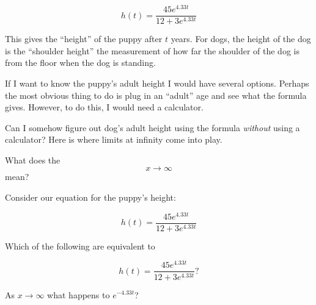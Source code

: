 \documentclass{ximera}
\begin{document}
\[
h(t) = \frac{45 e^{4.33 t}}{12+3 e^{4.33 t}}
\]

This gives the ``height'' of the puppy after $t$ years. For dogs, the
height of the dog is the ``shoulder height'' the measurement of how
far the shoulder of the dog is from the floor when the dog is
standing.

If I want to know the puppy's adult height I would have several
options. Perhaps the most obvious thing to do is plug in an ``adult''
age and see what the formula gives. However, to do this, I would need
a calculator.

Can I somehow figure out dog's adult height using the formula
\emph{without} using a calculator? Here is where limits at infinity
come into play.


\begin{question}
What does the
\[
x\to \infty
\]
mean?
\begin{multipleChoice}
\end{multipleChoice}
\end{question}

Consider our equation for the puppy's height:


\[
h(t) = \frac{45 e^{4.33 t}}{12+3 e^{4.33 t}}
\]

\begin{question}
Which of the following are equivalent to 

\[
h(t) = \frac{45 e^{4.33 t}}{12+3 e^{4.33 t}}?
\]

\begin{multipleChoice}
\end{multipleChoice}
\end{question}

\begin{question}
As $x\to \infty$ what happens to $e^{-4.33t}$?
\begin{multipleChoice}
\end{multipleChoice}
\end{question}
\end{document}
